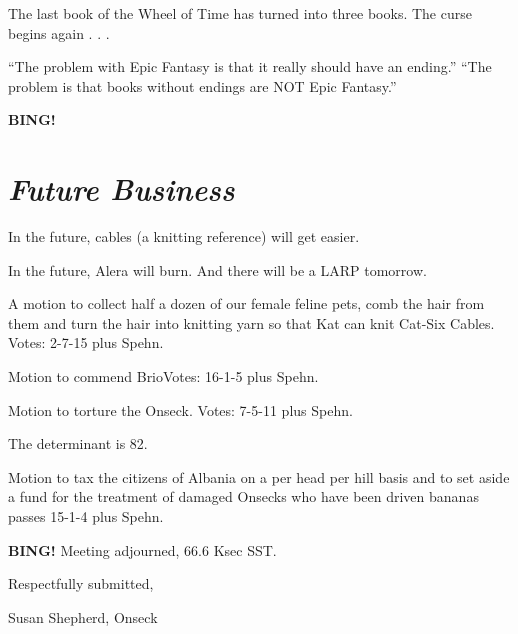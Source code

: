 \documentclass[10pt]{article}
\newcommand{\bing}{{\bf BING!} }
\newcommand{\goto}[1]{\bing \vskip 12pt \section*{{\em{#1}}}}
\newcommand{\ps}{ plus Spehn\xspace}
\begin{document}
The last book of the Wheel of Time has turned into three books. The curse begins again . . .

``The problem with Epic Fantasy is that it really should have an ending.'' ``The problem is that books without endings are NOT Epic Fantasy.''

\goto{Future Business}

In the future, cables (a knitting reference) will get easier.

In the future, Alera will burn. And there will be a LARP tomorrow.

A motion to collect half a dozen of our female feline pets, comb the hair from them and turn the hair into knitting yarn so that Kat can knit Cat-Six Cables. Votes: 2-7-15\ps.

Motion to commend BrioVotes: 16-1-5\ps. 

Motion to torture the Onseck. Votes: 7-5-11\ps.

The determinant is 82. 

Motion to tax the citizens of Albania on a per head per hill basis and to set aside a fund for the treatment of damaged Onsecks who have been driven bananas passes 15-1-4\ps.

\bing
\noindent
Meeting adjourned, 66.6 Ksec SST.

\vspace{18pt}

\centerline{Respectfully submitted,}
\centerline{Susan Shepherd, Onseck}
\end{document}
